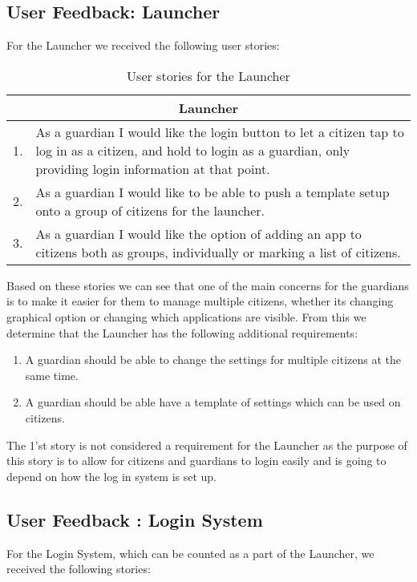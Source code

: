 \subsection{User Feedback: Launcher}
For the Launcher we received the following user stories:

\begin{table}[H]
\begin{tabular}{|c|p{12.5cm}|}
\hline 
\multicolumn{2}{|c|}{Launcher}\\ \hline 
1. & As a guardian I would like the login button to let a citizen tap to log in
as a citizen, and hold to login as a guardian, only providing login information
at that point.\\\hline
2. & As a guardian I would like to be able to push a template setup onto a group
of citizens for the launcher.\\\hline
3. & As a guardian I would like the option of adding an app to citizens both as
groups, individually or marking a list of citizens.\\\hline
\end{tabular}
\caption{User stories for the Launcher}
\label{UserStoriesLauncher}
\end{table}

Based on these stories we can see that one of the main concerns for the
guardians is to make it easier for them to manage multiple citizens, whether its
changing graphical option or changing which applications are visible. From this
we determine that the Launcher has the following additional requirements:

\begin{enumerate}
  \item A guardian should be able to change the settings for multiple
  citizens at the same time.
  \item A guardian should be able have a template of settings which can be used
  on citizens.
\end{enumerate}
The 1'st story is not considered a requirement for the Launcher as the purpose
of this story is to allow for citizens and guardians to login easily and is
going to depend on how the log in system is set up.\nl

\subsection{User Feedback : Login System}
For the Login System, which can be counted as a part of the Launcher, we
received the following stories:

